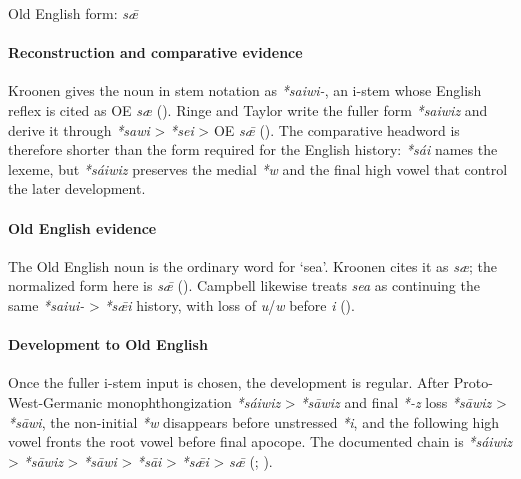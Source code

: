 \documentclass[
  british,
  a4paper,
]{article}
\begin{document}
Old English form: \emph{sǣ}

\paragraph{Reconstruction and comparative
evidence}\label{reconstruction-and-comparative-evidence-24}

Kroonen gives the noun in stem notation as \emph{*saiwi-}, an i-stem
whose English reflex is cited as OE \emph{sæ}
(). Ringe and Taylor write
the fuller form \emph{*saiwiz} and derive it through \emph{*sawi}
\textgreater{} \emph{*sei} \textgreater{} OE \emph{sǣ}
().
The comparative headword is therefore shorter than the form required for
the English history: \emph{*sái} names the lexeme, but \emph{*sáiwiz}
preserves the medial \emph{*w} and the final high vowel that control the
later development.

\paragraph{Old English evidence}\label{old-english-evidence-24}

The Old English noun is the ordinary word for `sea'. Kroonen cites it as
\emph{sæ}; the normalized form here is \emph{sǣ}
(). Campbell likewise
treats \emph{sea} as continuing the same \emph{*saiui-} \textgreater{}
\emph{*sǣi} history, with loss of \emph{u}/\emph{w} before \emph{i}
().

\paragraph{Development to Old
English}\label{development-to-old-english-24}

Once the fuller i-stem input is chosen, the development is regular.
After Proto-West-Germanic monophthongization \emph{*sáiwiz}
\textgreater{} \emph{*sāwiz} and final \emph{*-z} loss \emph{*sāwiz}
\textgreater{} \emph{*sāwi}, the non-initial \emph{*w} disappears before
unstressed \emph{*i}, and the following high vowel fronts the root vowel
before final apocope. The documented chain is \emph{*sáiwiz}
\textgreater{} \emph{*sāwiz} \textgreater{} \emph{*sāwi} \textgreater{}
\emph{*sāi} \textgreater{} \emph{*sǣi} \textgreater{} \emph{sǣ}
(;
).
\end{document}
